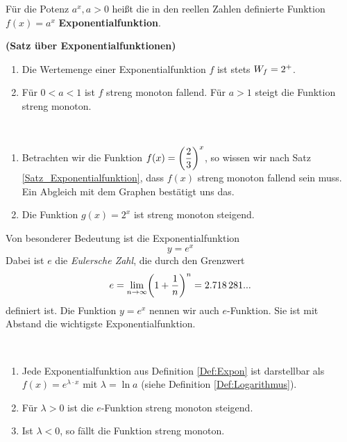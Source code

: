 \documentclass[ngerman, 12pt]{nssheetxea}
\begin{document}
\begin{definition} Für die Potenz $a^x, a>0$ heißt die in den reellen Zahlen definierte Funktion $f(x)=a^x$ \textbf{Exponentialfunktion}.
\label{Def:Expon}
 
\end{definition}

\begin{theorem} \textbf{(Satz über Exponentialfunktionen)}
\begin{enumerate}[1.]
\item Die Wertemenge einer Exponentialfunktion $f$ ist stets $W_f=2^+$. 
\item Für $0<a<1$ ist $f$ streng monoton fallend. Für $a>1$ steigt die Funktion streng monoton.
\end{enumerate}
\label{Satz_Exponentialfunktion}
\end{theorem}

\begin{example} \

\begin{enumerate}
\item Betrachten wir die Funktion $f(x)=\mleft( \dfrac{2}{3} \mright)^x$, so wissen wir nach Satz \ref{Satz_Exponentialfunktion}, dass $f(x)$ streng monoton fallend sein muss. Ein Abgleich mit dem Graphen bestätigt uns das.
\item Die Funktion $g(x)=2^x$ ist streng monoton steigend.
\end{enumerate}
\begin{center}
\end{center}
\end{example}

Von besonderer Bedeutung ist die Exponentialfunktion 
\[ y=e^x \]
Dabei ist $e$ die \textit{Eulersche Zahl}, die durch den Grenzwert 
\[
e=\lim_{n\rightarrow \infty} \mleft( 1+\dfrac{1}{n}\mright) ^n = \num{2,718281}...
\]
definiert ist. Die Funktion $y=e^x$ nennen wir auch $e$-Funktion. Sie ist mit Abstand die wichtigste Exponentialfunktion. 
\begin{theorem} \
\begin{enumerate}
\item Jede Exponentialfunktion aus Definition \ref{Def:Expon} ist darstellbar als $f(x)=e^{\lambda\cdot x}$ mit $\lambda = \ln a$ (siehe Definition \ref{Def:Logarithmus}). 
\item Für $\lambda > 0$ ist die $e$-Funktion streng monoton steigend.
\item Ist $\lambda < 0$, so fällt die Funktion streng monoton. 
\end{enumerate}
\end{theorem}
\end{document}
